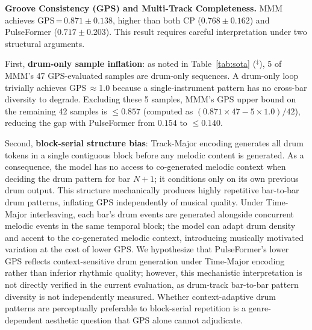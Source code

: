 \documentclass[pdflatex,sn-mathphys-num,twocolumn]{sn-jnl}
\theoremstyle{thmstyleone}
\theoremstyle{thmstyletwo}
\begin{document}
\textbf{Groove Consistency (GPS) and Multi-Track Completeness.}
MMM achieves GPS\,=\,$0.871\!\pm\!0.138$, higher than both CP ($0.768\!\pm\!0.162$) and PulseFormer ($0.717\!\pm\!0.203$). This result requires careful interpretation under two structural arguments.

First, \textbf{drum-only sample inflation}: as noted in Table~\ref{tab:sota} ($^{\ddagger}$), 5 of MMM's 47 GPS-evaluated samples are drum-only sequences. A drum-only loop trivially achieves GPS\,$\approx$1.0 because a single-instrument pattern has no cross-bar diversity to degrade. Excluding these 5 samples, MMM's GPS upper bound on the remaining 42 samples is $\leq 0.857$ (computed as $(0.871\times47 - 5\times1.0)/42$), reducing the gap with PulseFormer from $0.154$ to $\leq 0.140$.

Second, \textbf{block-serial structure bias}: Track-Major encoding generates all drum tokens in a single contiguous block before any melodic content is generated. As a consequence, the model has no access to co-generated melodic context when deciding the drum pattern for bar $N+1$; it conditions only on its own previous drum output. This structure mechanically produces highly repetitive bar-to-bar drum patterns, inflating GPS independently of musical quality. Under Time-Major interleaving, each bar's drum events are generated alongside concurrent melodic events in the same temporal block; the model can adapt drum density and accent to the co-generated melodic context, introducing musically motivated variation at the cost of lower GPS. We hypothesize that PulseFormer's lower GPS reflects context-sensitive drum generation under Time-Major encoding rather than inferior rhythmic quality; however, this mechanistic interpretation is not directly verified in the current evaluation, as drum-track bar-to-bar pattern diversity is not independently measured. Whether context-adaptive drum patterns are perceptually preferable to block-serial repetition is a genre-dependent aesthetic question that GPS alone cannot adjudicate.
\end{document}
